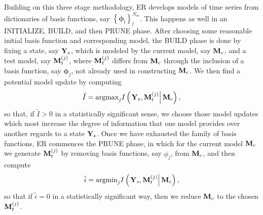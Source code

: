 \documentclass[a4paper,11pt]{article}
\begin{document}
Building on this three stage methodology, ER develops models of time series from dictionaries of basis functions, say $\left\{\mathbf{\phi}_{l}\right\}_{l}^{N_{m}}$.  This happens as well in an  INITIALIZE, BUILD, and then PRUNE phase.  After choosing some reasonable initial basis function and corresponding model, the BUILD phase is done by fixing a state, say ${\bf Y}_{s}$, which is modeled by the current model, say ${\bf M}_{c}$, and a test model, say ${\bf M}^{(j)}_{t}$, where ${\bf M}^{(j)}_{t}$ differs from ${\bf M}_{c}$ through the inclusion of a basis function, say $\mathbf{\phi}_{j}$, not already used in constructing ${\bf M}_{c}$.  We then find a potential model update by computing
\[
\tilde{I} = \text{argmax}_{j}I\left(\left.{\bf Y}_{s}, {\bf M}_{t}^{(j)}\right| {\bf M}_{c}\right),
\]
so that, if $\tilde{I}>0$ in a statistically significant sense, we choose those model updates which most increase the degree of information that one model provides over another regards to a state ${\bf Y}_{s}$.  Once we have exhausted the family of basis functions, ER commences the PRUNE phase, in which for the current model ${\bf M}_{c}$ we generate ${\bf M}_{t}^{(j)}$ by removing basis functions, say $\phi_{j}$, from ${\bf M}_{c}$, and then compute 
\[
\tilde{i} = \text{argmin}_{j}I\left(\left.{\bf Y}_{s}, {\bf M}_{t}^{(j)}\right| {\bf M}_{c}\right),
\]
so that if $\tilde{i}=0$ in a statistically significant way, then we reduce ${\bf M}_{c}$ to the chosen ${\bf M}_{t}^{(j)}$.  
\end{document}
